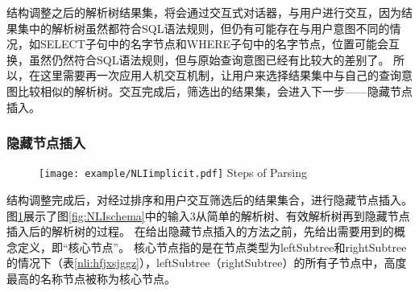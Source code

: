 结构调整之后的解析树结果集，将会通过交互式对话器，与用户进行交互，因为结果集中的解析树虽然都符合SQL语法规则，但仍有可能存在与用户意图不同的情况，如SELECT子句中的名字节点和WHERE子句中的名字节点，位置可能会互换，虽然仍然符合SQL语法规则，但与原始查询意图已经有比较大的差别了。
所以，在这里需要再一次应用人机交互机制，让用户来选择结果集中与自己的查询意图比较相似的解析树。交互完成后，筛选出的结果集，会进入下一步——隐藏节点插入。

\subsubsection{隐藏节点插入}

\begin{figure}[!htp]
  \centering
  \texttt{[image: example/NLIimplicit.pdf]}
    {Steps of Parsing}
  \label{fig:NLIimplicit}
\end{figure}

结构调整完成后，对经过排序和用户交互筛选后的结果集合，进行隐藏节点插入。
图\ref{fig:NLIimplicit}展示了图\ref{fig:NLIschema}中的输入3从简单的解析树、有效解析树再到隐藏节点插入后的解析树的过程。
在给出隐藏节点插入的方法之前，先给出需要用到的概念定义，即“核心节点”。
核心节点指的是在节点类型为leftSubtree和rightSubtree的情况下（表\ref{nli:hfjxsjggz}），leftSubtree（rightSubtree）的所有子节点中，高度最高的名称节点被称为核心节点。

